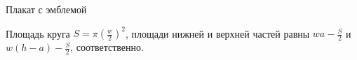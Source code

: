 \begin{tutorial}{Плакат с эмблемой}

Площадь круга $S=\pi\left(\frac{w}{2}\right)^2$, площади нижней и верхней частей равны $wa - \frac{S}{2}$ и $w(h-a) - \frac{S}{2}$, соответственно.

\end{tutorial}
